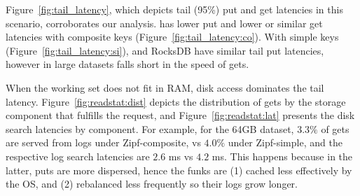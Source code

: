 Figure~\ref{fig:tail_latency}, which depicts tail (95\%) put and get latencies in this scenario, 
corroborates our analysis. \sys\/ has lower put and lower or similar get latencies with composite keys
(Figure~\ref{fig:tail_latency:co}). With simple keys (Figure~\ref{fig:tail_latency:si}),  
\sys\/ and RocksDB have similar tail put latencies, however in large datasets \sys\/ falls 
short in the speed of gets.

When the working set does not fit in RAM, disk access dominates the tail latency.
Figure~\ref{fig:readstat:dist} depicts the distribution of gets by the storage  component 
that fulfills the request, and Figure~\ref{fig:readstat:lat} presents the disk search latencies by component. 
For example, for the 64GB dataset, $3.3\%$ of gets are served from logs under Zipf-composite, vs $4.0\%$ under Zipf-simple,
and the respective log search latencies are $2.6$ ms vs $4.2$ ms. This happens because in the latter, puts are more dispersed, 
hence the funks are (1) cached less effectively by the OS, and (2) rebalanced less frequently so their logs grow longer.

